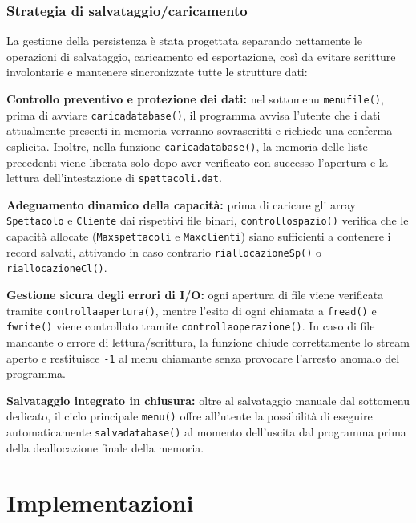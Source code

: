 \documentclass[11pt,a4paper,oneside,openany]{book}
\newenvironment{listacomp}{%
    \small
    \begin{list}{\textendash}{%
        \setlength{\topsep}{2pt}%
        \setlength{\partopsep}{0pt}%
        \setlength{\itemsep}{1pt}%
        \setlength{\parsep}{0pt}%
        \setlength{\leftmargin}{1.2em}%
    }%
}{%
    \end{list}%
}
\begin{document}
\subsection{Strategia di salvataggio/caricamento}
La gestione della persistenza è stata progettata separando nettamente le operazioni di salvataggio, caricamento ed esportazione, così da evitare scritture involontarie e mantenere sincronizzate tutte le strutture dati:
\begin{listacomp}
    \item \textbf{Controllo preventivo e protezione dei dati:} nel sottomenu \texttt{menufile()}, prima di avviare \texttt{caricadatabase()}, il programma avvisa l'utente che i dati attualmente presenti in memoria verranno sovrascritti e richiede una conferma esplicita. Inoltre, nella funzione \texttt{caricadatabase()}, la memoria delle liste precedenti viene liberata solo dopo aver verificato con successo l'apertura e la lettura dell'intestazione di \texttt{spettacoli.dat}.
    \item \textbf{Adeguamento dinamico della capacità:} prima di caricare gli array \texttt{Spettacolo} e \texttt{Cliente} dai rispettivi file binari, \texttt{controllospazio()} verifica che le capacità allocate (\texttt{Maxspettacoli} e \texttt{Maxclienti}) siano sufficienti a contenere i record salvati, attivando in caso contrario \texttt{riallocazioneSp()} o \texttt{riallocazioneCl()}.
    \item \textbf{Gestione sicura degli errori di I/O:} ogni apertura di file viene verificata tramite \texttt{controllaapertura()}, mentre l'esito di ogni chiamata a \texttt{fread()} e \texttt{fwrite()} viene controllato tramite \texttt{controllaoperazione()}. In caso di file mancante o errore di lettura/scrittura, la funzione chiude correttamente lo stream aperto e restituisce \texttt{-1} al menu chiamante senza provocare l'arresto anomalo del programma.
    \item \textbf{Salvataggio integrato in chiusura:} oltre al salvataggio manuale dal sottomenu dedicato, il ciclo principale \texttt{menu()} offre all'utente la possibilità di eseguire automaticamente \texttt{salvadatabase()} al momento dell'uscita dal programma prima della deallocazione finale della memoria.
\end{listacomp}


\chapter{Implementazioni}\label{cap:implementazioni}
\end{document}
